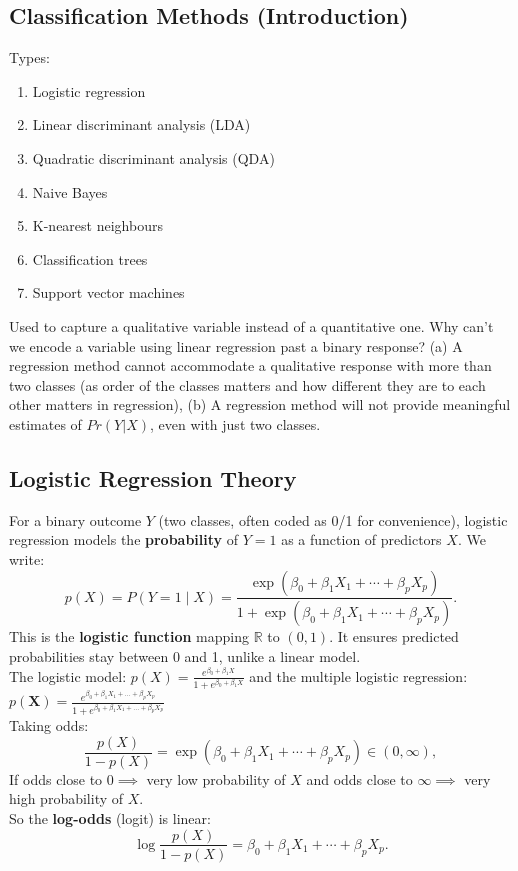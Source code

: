 \documentclass[11pt]{article}
\begin{document}
\subsection{Classification Methods (Introduction)}
Types:
\begin{enumerate}
    \item Logistic regression
    \item Linear discriminant analysis (LDA)
    \item Quadratic discriminant analysis (QDA)
    \item Naive Bayes
    \item K-nearest neighbours
    \item Classification trees
    \item Support vector machines
\end{enumerate}
\vspace{1em} \noindent Used to capture a qualitative variable instead of a quantitative one. Why can't we encode a variable using linear regression past a binary response? (a) A regression method cannot accommodate a qualitative response with more than two classes (as order of the classes matters and how different they are to each other matters in regression), (b) A regression method will not provide meaningful estimates of $Pr(Y|X)$, even with just two classes.


\subsection{Logistic Regression Theory}
For a binary outcome $Y$ (two classes, often coded as 0/1 for convenience), logistic regression models the \textbf{probability} of $Y=1$ as a function of predictors $X$. We write:
\[ p(X) = P(Y=1 \mid X) = \frac{\exp(\beta_0 + \beta_1 X_1 + \cdots + \beta_p X_p)}{1 + \exp(\beta_0 + \beta_1 X_1 + \cdots + \beta_p X_p)}. \]
This is the \textbf{logistic function} mapping $\mathbb{R}$ to $(0,1)$. It ensures predicted probabilities stay between 0 and 1, unlike a linear model. \\

\noindent The logistic model: $p(X) = \frac{e^{\beta_{0}  + \beta_{1}X}}{1 + e^{\beta_{0} + \beta_{1}X}}$ and the multiple logistic regression: $p(\boldsymbol{X}) = \frac{e^{\beta_{0} + \beta_{1}X_{1} + ... + \beta_{p}X_{p}}}{1 + e^{\beta_{0} + \beta_{1}X_{1} + ... + \beta_{p}X_{p}}}$ \\

\noindent Taking odds:
\[ \frac{p(X)}{1-p(X)} = \exp(\beta_0 + \beta_1 X_1 + \cdots + \beta_p X_p) \in (0, \infty), \]
If odds close to $0 \implies $ very low probability of $X$ and odds close to $\infty \implies$ very high probability of $X$. \\
\noindent So the \textbf{log-odds} (logit) is linear:
\[ \log\frac{p(X)}{1-p(X)} = \beta_0 + \beta_1 X_1 + \cdots + \beta_p X_p. \]
\end{document}
